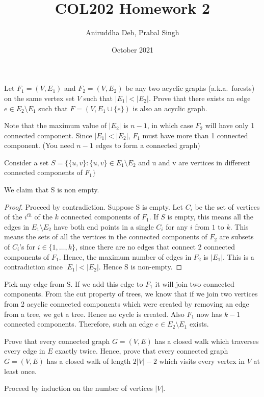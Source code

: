 \documentclass[12pt,answers]{exam}
\title{\vspace{-2em}COL202 Homework 2\vspace{-0.3em}}
\author{Aniruddha Deb, Prabal Singh\vspace{-1em}}
\date{October 2021}
\begin{document}
\maketitle
\pagestyle{empty}
\begin{questions}

\question Let $F_1=(V,E_1)$ and $F_2=(V,E_2)$ be any two acyclic graphs (a.k.a.\ forests) on the same vertex set $V$ such that $|E_1|<|E_2|$. Prove that there exists an edge $e\in E_2\setminus E_1$ such that $F=(V,E_1\cup\{e\})$ is also an acyclic graph.
\begin{solution}
Note that the maximum value of $|E_2|$ is $n-1$, in which case $F_2$ will have only 1 connected component. Since $|E_1|<|E_2|$, $F_1$ must have more than 1 connected component. (You need $n-1$ edges to form a connected graph)

Consider a set $S = \{ \{ u,v \} : \{ u,v \} \in E_1 \setminus E_2$ and u and v are vertices in different connected components of $ F_1\}$

We claim that S is non empty.

\begin{proof} Proceed by contradiction. Suppose S is empty. Let $C_i$ be the set of vertices of the $i^{th}$ of the $k$ connected components of $F_1$. If $S$ is empty, this means all the edges in  $E_1 \setminus E_2$ have both end points in a single $C_i$ for any $i$ from $1$ to $k$. This means the sets of all the vertices in the connected components of $F_2$ are subsets of $C_i$'s for $i \in \{1,\ldots,k\}$, since there are no edges that connect 2 connected components of $F_1$. Hence, the maximum number of edges in $F_2$ is $|E_1|$. This is a contradiction since $|E_1|<|E_2|$. Hence S is non-empty.
\end{proof}

Pick any edge from S. If we add this edge to $F_1$ it will join two connected components. From the cut property of trees, we know that if we join two vertices from 2 acyclic connected components which were created by removing an edge from a tree, we get a tree. Hence no cycle is created. Also $F_1$ now has $k-1$ connected components. Therefore, such an edge $e \in E_2 \setminus E_1$ exists.
\end{solution}

\question Prove that every connected graph $G=(V,E)$ has a closed walk which traverses every edge in $E$ exactly twice. Hence, prove that every connected graph $G=(V,E)$ has a closed walk of length $2|V|-2$ which visits every vertex in $V$ at least once.
\begin{solution} Proceed by induction on the number of vertices $|V|$. 


\end{solution}
\end{questions}
\end{document}
